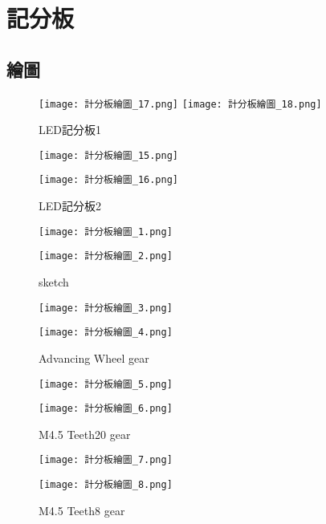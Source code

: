 \chapter{記分板}
\section{繪圖}
{
\begin{figure}[hbt!]
  \centering
  \texttt{[image: 計分板繪圖\_17.png]}
  \centering
  \texttt{[image: 計分板繪圖\_18.png]}
  \caption{LED記分板1}
  \label{fig:photo1}
\end{figure}

\begin{figure}[hbt!]
  \centering
  \texttt{[image: 計分板繪圖\_15.png]}
\end{figure}
\begin{figure}[hbt!]
  \centering
  \texttt{[image: 計分板繪圖\_16.png]}
  \caption{LED記分板2}
  \label{fig:photo2}
\end{figure}

\begin{figure}[hbt!]
  \centering
  \texttt{[image: 計分板繪圖\_1.png]}
\end{figure}
\begin{figure}[hbt!]
  \centering
  \texttt{[image: 計分板繪圖\_2.png]}
  \caption{sketch}
  \label{fig:photo3}
\end{figure}

\begin{figure}[hbt!]
  \centering
  \texttt{[image: 計分板繪圖\_3.png]}
\end{figure}
\begin{figure}[hbt!]
  \centering
  \texttt{[image: 計分板繪圖\_4.png]}
  \caption{Advancing Wheel gear}
  \label{fig:photo4}
\end{figure}

\begin{figure}[hbt!]
  \centering
  \texttt{[image: 計分板繪圖\_5.png]}
\end{figure}
\begin{figure}[hbt!]
  \centering
  \texttt{[image: 計分板繪圖\_6.png]}
  \caption{M4.5 Teeth20 gear}
  \label{fig:photo5}
\end{figure}

\begin{figure}[hbt!]
  \centering
  \texttt{[image: 計分板繪圖\_7.png]}
\end{figure}
\begin{figure}[hbt!]
  \centering
  \texttt{[image: 計分板繪圖\_8.png]}
  \caption{M4.5 Teeth8 gear}
  \label{fig:photo6}
\end{figure}

}
